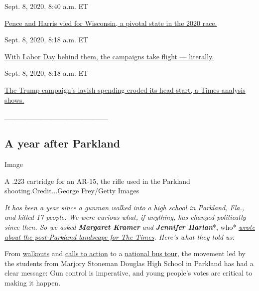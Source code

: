 \href{https://www.nytimes3xbfgragh.onion/live/2020/09/08/us/trump-vs-biden\#pence-and-harris-vied-for-wisconsin-a-pivotal-state-in-the-2020-race}{}

Sept. 8, 2020, 8:40 a.m. ET

\href{https://www.nytimes3xbfgragh.onion/live/2020/09/08/us/trump-vs-biden\#pence-and-harris-vied-for-wisconsin-a-pivotal-state-in-the-2020-race}{Pence
and Harris vied for Wisconsin, a pivotal state in the 2020
race.}\href{https://www.nytimes3xbfgragh.onion/live/2020/09/08/us/trump-vs-biden\#with-labor-day-behind-them-the-campaigns-take-flight-literally}{}

Sept. 8, 2020, 8:18 a.m. ET

\href{https://www.nytimes3xbfgragh.onion/live/2020/09/08/us/trump-vs-biden\#with-labor-day-behind-them-the-campaigns-take-flight-literally}{With
Labor Day behind them, the campaigns take flight ---
literally.}\href{https://www.nytimes3xbfgragh.onion/live/2020/09/08/us/trump-vs-biden\#the-trump-campaigns-lavish-spending-eroded-its-head-start-a-times-analysis-shows}{}

Sept. 8, 2020, 8:18 a.m. ET

\href{https://www.nytimes3xbfgragh.onion/live/2020/09/08/us/trump-vs-biden\#the-trump-campaigns-lavish-spending-eroded-its-head-start-a-times-analysis-shows}{The
Trump campaign's lavish spending eroded its head start, a Times analysis
shows.}

\emph{\_\_\_\_\_\_\_\_\_\_\_\_\_\_\_\_\_\_\_\_}

\hypertarget{a-year-after-parkland}{%
\subsection{A year after Parkland}\label{a-year-after-parkland}}

Image

A .223 cartridge for an AR-15, the rifle used in the Parkland
shooting.Credit...George Frey/Getty Images

\emph{It has been a year since a gunman walked into a high school in
Parkland, Fla., and killed 17 people. We were curious what, if anything,
has changed politically since then. So we asked} \emph{\textbf{Margaret
Kramer}} \emph{and} \emph{\textbf{Jennifer Harlan}}*, who*
\href{https://www.nytimes3xbfgragh.onion/2019/02/13/us/parkland-shooting.html}{\emph{wrote
about the post-Parkland landscape for The Times}}\emph{. Here's what
they told us:}

From
\href{https://www.nytimes3xbfgragh.onion/2018/03/14/us/school-walkout.html}{walkouts}
and
\href{https://www.nytimes3xbfgragh.onion/2018/02/21/us/politics/trump-guns-school-shooting.html}{calls
to action} to a
\href{https://www.nytimes3xbfgragh.onion/2018/08/15/us/politics/parkland-students-voting.html}{national
bus tour}, the movement led by the students from Marjory Stoneman
Douglas High School in Parkland has had a clear message: Gun control is
imperative, and young people's votes are critical to making it happen.

